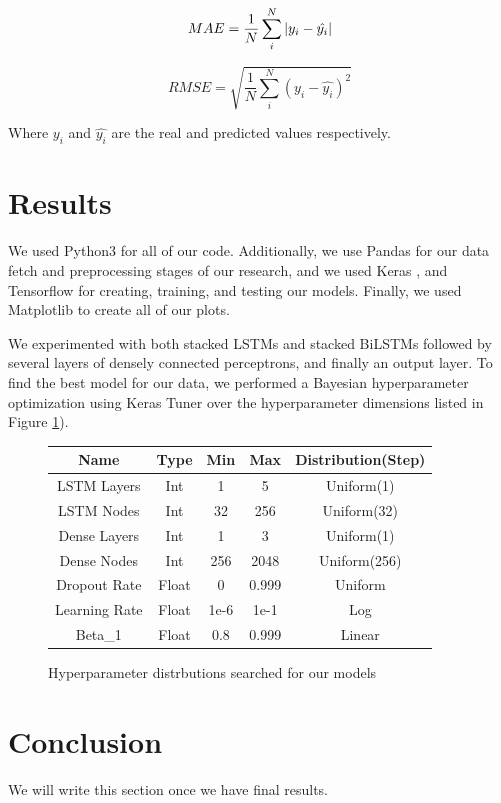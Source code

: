 \documentclass[final]{cvpr}
\begin{document}
    \begin{equation}
        MAE = \frac{1}{N}\sum_i^N|y_i - \hat{y_i}| \\
    \end{equation}

    \begin{equation}
        RMSE = \sqrt{\frac{1}{N}\sum_i^N(y_i - \hat{y_i})^2}
    \end{equation}

    Where $y_i$ and $\hat{y_i}$ are the real and predicted values respectively.

\section{Results}

    We used Python3 for all of our code. Additionally, we use Pandas 
    \cite{pandas} for our data fetch and preprocessing stages of our research,
    and we used Keras \cite{keras}, and Tensorflow \cite{tensorflow} for 
    creating, training, and testing our models. Finally, we used Matplotlib 
    \cite{matplotlib} to create all of our plots.

    We experimented with both stacked LSTMs and stacked BiLSTMs followed by 
    several layers of densely connected perceptrons, and finally an output 
    layer. To find the best model for our data, we performed a Bayesian
    hyperparameter optimization using Keras Tuner \cite{kerastuner} over the
    hyperparameter dimensions listed in Figure \ref{fig:hyperparameters}). 

    \begin{figure}[h]
        \caption{Hyperparameter distrbutions searched for our models}
        \center
        \begin{tabular}{| c || c | c | c | c |}
            \hline 
            Name & Type & Min & Max & Distribution(Step) \\ 
            \hline
            \hline
            LSTM Layers   & Int   & 1   & 5    & Uniform(1)\\
            LSTM Nodes    & Int   & 32  & 256  & Uniform(32) \\
            Dense Layers  & Int   & 1   & 3    & Uniform(1)\\
            Dense Nodes   & Int   & 256 & 2048 & Uniform(256)\\
            Dropout Rate  & Float & 0   & 0.999& Uniform\\
            Learning Rate & Float & 1e-6& 1e-1 & Log\\
            Beta\_1        & Float & 0.8 & 0.999& Linear\\
            \hline
        \end{tabular}
        \label{fig:hyperparameters}
    \end{figure}




\section{Conclusion}

We will write this section once we have final results.

\nocite{*}

{\small
    
    
}
\end{document}
